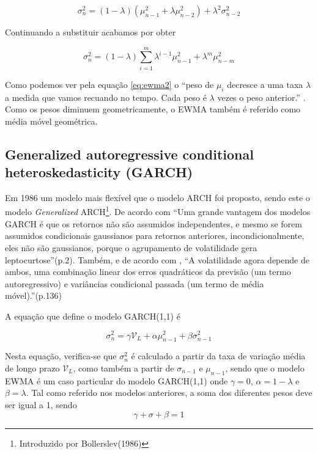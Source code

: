 \documentclass[
  12pt,
  a4paper,
  openany]{book}
\begin{document}
\begin{equation} 
  \sigma_{n}^{2} = (1-\lambda)(\mu_{n-1}^{2}+\lambda\mu_{n-2}^{2})+\lambda^{2}\sigma_{n-2}^{2}
  \label{eq:ewma1}
\end{equation}

Continuando a substituir acabamos por obter

\begin{equation} 
  \sigma_{n}^{2} = (1-\lambda)\sum_{i=1}^{m}\lambda^{i-1}\mu_{n-1}^{2}+\lambda^{m}\mu_{n-m}^{2}
  \label{eq:ewma2}
\end{equation}

Como podemos ver pela equação \eqref{eq:ewma2} o ``peso de \(\mu_{i}\) decresce a uma taxa \(\lambda\) a medida que vamos recuando no tempo. Cada peso é \(\lambda\) vezes o peso anterior.'' \citep[p.226]{HullRisk2018}. Como os pesos diminuem geometricamente, o EWMA também é referido como média móvel geométrica.

\hypertarget{generalized-autoregressive-conditional-heteroskedasticity-garch}{%
\subsection{Generalized autoregressive conditional heteroskedasticity (GARCH)}\label{generalized-autoregressive-conditional-heteroskedasticity-garch}}

Em 1986 um modelo mais flexível que o modelo ARCH foi proposto, sendo este o modelo \emph{Generalized} ARCH\footnote{Introduzido por Bollerslev(1986)}. De acordo com \citet{volatilitymodels} ``Uma grande vantagem dos modelos GARCH é que os retornos não são assumidos independentes, e mesmo se forem assumidos condicionais gaussianos para retornos anteriores, incondicionalmente, eles não são gaussianos, porque o agrupamento de volatilidade gera leptocurtose''(p.2). Também, e de acordo com \citet{portanalyse}, ``A volatilidade agora depende de ambos, uma combinação linear dos erros quadráticos da previsão (um termo autoregressivo) e variâncias condicional passada (um termo de média móvel).''(p.136)

A equação que define o modelo GARCH(1,1) é

\begin{equation} 
  \sigma_{n}^{2} = \gamma\mathcal{V}_{L} + \alpha\mu_{n-1}^{2} + \beta\sigma_{n-1}^{2}
  \label{eq:garch}
\end{equation}

Nesta equação, verifica-se que \(\sigma_{n}^{2}\) é calculado a partir da taxa de variação média de longo prazo \(\mathcal{V}_{L}\), como também a partir de \(\sigma_{n-1}\) e \(\mu_{n-1}\), sendo que o modelo EWMA é um caso particular do modelo GARCH(1,1) onde \(\gamma=0\), \(\alpha=1-\lambda\) e \(\beta=\lambda\). Tal como referido nos modelos anteriores, a soma dos diferentes pesos deve ser igual a 1, sendo \[\gamma+\sigma+\beta=1\]
\end{document}
